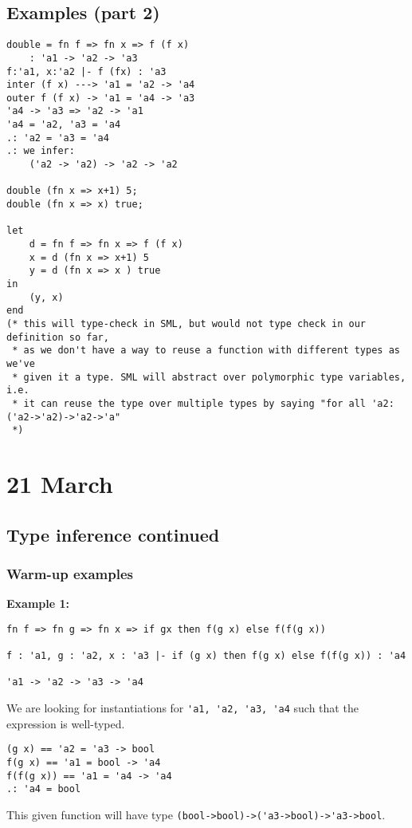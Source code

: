 \documentclass[11pt]{article}
\begin{document}
\subsection{Examples (part 2)}
\begin{verbatim}
double = fn f => fn x => f (f x)
    : 'a1 -> 'a2 -> 'a3
f:'a1, x:'a2 |- f (fx) : 'a3
inter (f x) ---> 'a1 = 'a2 -> 'a4
outer f (f x) -> 'a1 = 'a4 -> 'a3
'a4 -> 'a3 => 'a2 -> 'a1
'a4 = 'a2, 'a3 = 'a4
.: 'a2 = 'a3 = 'a4
.: we infer:
    ('a2 -> 'a2) -> 'a2 -> 'a2

double (fn x => x+1) 5;
double (fn x => x) true;

let
    d = fn f => fn x => f (f x)
    x = d (fn x => x+1) 5
    y = d (fn x => x ) true
in
    (y, x)
end
(* this will type-check in SML, but would not type check in our definition so far,
 * as we don't have a way to reuse a function with different types as we've 
 * given it a type. SML will abstract over polymorphic type variables, i.e.
 * it can reuse the type over multiple types by saying "for all 'a2:('a2->'a2)->'a2->'a"
 *)
\end{verbatim}

\section{21 March}
\subsection{Type inference continued}
\subsubsection{Warm-up examples}

\textbf{Example 1:}
\begin{verbatim}
fn f => fn g => fn x => if gx then f(g x) else f(f(g x))

f : 'a1, g : 'a2, x : 'a3 |- if (g x) then f(g x) else f(f(g x)) : 'a4

'a1 -> 'a2 -> 'a3 -> 'a4
\end{verbatim}

We are looking for instantiations for \verb~'a1, 'a2, 'a3, 'a4~ such that the expression is well-typed.

\begin{verbatim}
(g x) == 'a2 = 'a3 -> bool
f(g x) == 'a1 = bool -> 'a4
f(f(g x)) == 'a1 = 'a4 -> 'a4
.: 'a4 = bool
\end{verbatim}

This given function will have type \verb~(bool->bool)->('a3->bool)->'a3->bool~.
\end{document}
